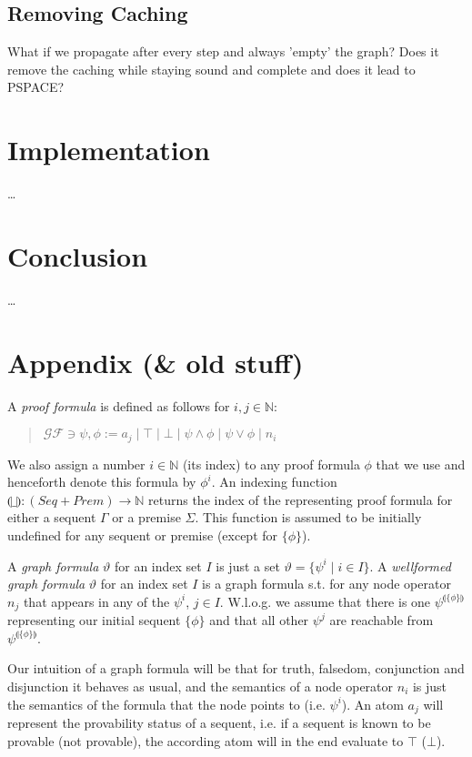 \documentclass{llncs}
\newcommand{\ind}[1]{\llparenthesis #1 \rrparenthesis}
\begin{document}
\subsection {Removing Caching}

What if we propagate after every step and always 'empty' the graph? Does it remove the caching
while staying sound and complete and does it lead to PSPACE?

\section{Implementation}

\ldots

\section{Conclusion}  

\ldots

\section{Appendix (\& old stuff)}

\begin{definition}
A \emph{proof formula} is defined as follows for $i,j\in \mathbb{N}$:
\begin{quote}
$\mathcal{GF} \ni \psi,\phi := a_j \mid \top \mid \bot \mid \psi\wedge \phi \mid \psi \vee \phi \mid n_i$
\end{quote}

We also assign a number $i\in\mathbb{N}$ (its index) to any proof formula $\phi$ that we use and henceforth denote this
formula by $\phi^i$. An indexing function $\ind{\_}:(Seq+Prem)\rightarrow \mathbb{N}$ returns the index of
the representing proof formula for either a sequent $\Gamma$ or a premise $\Sigma$. This function is assumed
to be initially undefined for any sequent or premise (except for $\{\phi\}$).

A \emph{graph formula} $\vartheta$ for an index set $I$
is just a set $\vartheta=\{\psi^i \mid i\in I \}$. A \emph{wellformed graph formula} $\vartheta$ for an index set $I$
is a graph formula s.t. for any node operator $n_j$ that appears in any of the $\psi^i$, $j\in I$.
W.l.o.g. we assume that there is one $\psi^{\ind{\{\phi\}}}$ representing our
initial sequent $\{\phi\}$ and that all other $\psi^j$ are reachable from $\psi^{\ind{\{\phi\}}}$.
\end{definition}

Our intuition of a graph formula will be that for truth, falsedom, conjunction and disjunction it behaves as usual,
and the semantics of a node operator $n_i$ is just the semantics of the formula that the node points to (i.e. $\psi^i$).
An atom $a_j$ will represent the provability status of a sequent, i.e. if a sequent is known to be provable (not provable),
the according atom will in the end evaluate to $\top$ ($\bot$).
\end{document}
